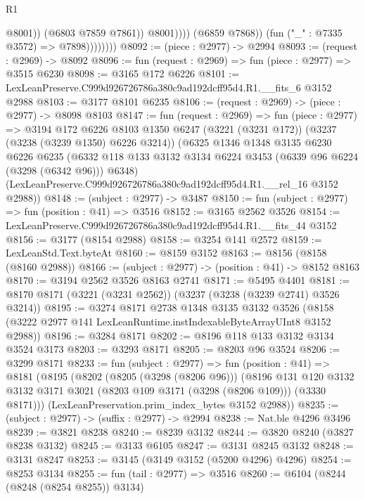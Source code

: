 \begin{lexlean}{R1}
\begin{coremodule}
                                  @8001))
                              (@6803 @7859 @7861))
                            @8001))))
                    (@6859 @7868))
                  (fun ("_" : @7335 @3572) => @7898))))))))
@8092 := (piece : @2977) -> @2994
@8093 := (request : @2969) -> @8092
@8096 := fun (request : @2969) => fun (piece : @2977) => @3515 @6230
@8098 := @3165 @172 @6226
@8101 := LexLeanPreserve.C999d926726786a380c9ad192dcff95d4.R1.__fits_6 @3152 @2988
@8103 := @3177 @8101 @6235
@8106 := (request : @2969) -> (piece : @2977) -> @8098 @8103
@8147 := fun (request : @2969) =>
  fun (piece : @2977) =>
  @3194
    @172
    @6226
    @8103
    @1350
    @6247
    (@3221 (@3231 @172))
    (@3237 (@3238 (@3239 @1350) @6226 @3214))
    (@6325
      @1346
      @1348
      @3135
      @6230
      @6226
      @6235
      (@6332 @118 @133 @3132 @3134 @6224 @3453 (@6339 @96 @6224 (@3298 (@6342 @96))) @6348)
      (LexLeanPreserve.C999d926726786a380c9ad192dcff95d4.R1.__rel_16 @3152 @2988))
@8148 := (subject : @2977) -> @3487
@8150 := fun (subject : @2977) => fun (position : @41) => @3516
@8152 := @3165 @2562 @3526
@8154 := LexLeanPreserve.C999d926726786a380c9ad192dcff95d4.R1.__fits_44 @3152
@8156 := @3177 (@8154 @2988)
@8158 := @3254 @141 @2572
@8159 := LexLeanStd.Text.byteAt
@8160 := @8159 @3152
@8163 := @8156 (@8158 (@8160 @2988))
@8166 := (subject : @2977) -> (position : @41) -> @8152 @8163
@8170 := @3194 @2562 @3526 @8163 @2741
@8171 := @5495 @4401
@8181 := @8170 @8171 (@3221 (@3231 @2562)) (@3237 (@3238 (@3239 @2741) @3526 @3214))
@8195 := @3274
    @8171
    @2738
    @1348
    @3135
    @3132
    @3526
    (@8158 (@3222 @2977 @141 LexLeanRuntime.instIndexableByteArrayUInt8 @3152 @2988))
@8196 := @3284 @8171
@8202 := @8196 @118 @133 @3132 @3134 @3524 @3173
@8203 := @3293 @8171
@8205 := @8203 @96 @3524
@8206 := @3299 @8171
@8233 := fun (subject : @2977) =>
  fun (position : @41) =>
  @8181
    (@8195
      (@8202
        (@8205 (@3298 (@8206 @96)))
        (@8196
          @131
          @120
          @3132
          @3132
          @3171
          @3021
          (@8203 @109 @3171 (@3298 (@8206 @109)))
          (@3330 @8171)))
      (LexLeanPreservation.prim_index_bytes @3152 @2988))
@8235 := (subject : @2977) -> (suffix : @2977) -> @2994
@8238 := Nat.ble @4296 @3496
@8239 := @3821 @8238
@8240 := @8239 @3132
@8244 := @3820 @8240 (@3827 @8238 @3132)
@8245 := @3133 @6105
@8247 := @3131 @8245 @3132
@8248 := @3131 @8247
@8253 := @3145 (@3149 @3152 (@5200 @4296) @4296)
@8254 := @8253 @3134
@8255 := fun (tail : @2977) => @3516
@8260 := @6104 (@8244 (@8248 (@8254 @8255)) @3134)

\end{coremodule}
\end{lexlean}

